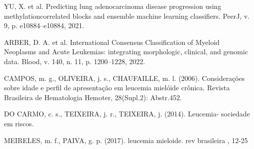 \documentclass[10pt, conference, compsocconf]{IEEEtran}
\begin{document}


\begin{thebibliography}{1}

\bibitem{}
YU, X. et al. Predicting lung adenocarcinoma disease progression using methylationcorrelated blocks and ensemble machine learning classifiers. PeerJ, v. 9, p. e10884–e10884, 2021.

\bibitem{}
ARBER, D. A. et al. International Consensus Classification of Myeloid Neoplasms and Acute Leukemias: integrating morphologic, clinical, and genomic data. Blood, v. 140, n. 11, p. 1200–1228, 2022.

\bibitem{}
CAMPOS, m. g., OLIVEIRA, j. s., CHAUFAILLE, m. l. (2006). Considerações sobre idade e perfil de apresentação em leucemia mielóide crônica. Revista Brasileira de Hematologia Hemoter, 28(Supl.2): Abstr.452. 

\bibitem{}
DO CARMO, c. s., TEIXEIRA, j. r., TEIXEIRA, j. (2014). Leucemia- sociedade em riscos. 

\bibitem{}
MEIRELES, m. f., PAIVA, g. p. (2017). leucemia mieloide. rev brasileira , 12-25

\end{thebibliography}


\end{document}
